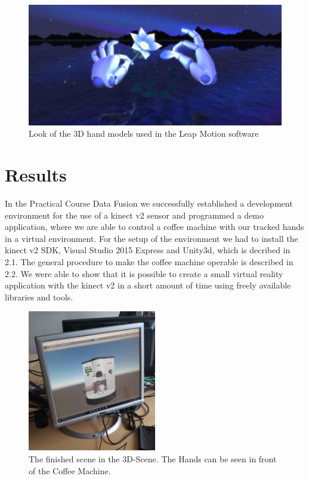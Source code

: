 \documentclass[11pt,a4paper,oldfontcommands, oneside]{memoir}
\begin{document}
\begin{figure}
\includegraphics[width=\textwidth]{./figures/playground-flower-scene}
\caption{Look of the 3D hand models used in the Leap Motion software \cite{leapHandModel}}
\end{figure}


\chapter{Results}

In the Practical Course Data Fusion we successfully established a development environment for the use of a kinect v2 sensor and programmed a demo application, where we are able to control a coffee machine with our tracked hands in a virtual environment. For the setup of the environment we had to install the kinect v2 SDK, Visual Studio 2015 Express and Unity3d, which is decribed in 2.1. The general procedure to make the coffee machine operable is described in 2.2. We were able to show that it is possible to create a small virtual reality application with the kinect v2 in a short amount of time using freely available libraries and tools. 

\begin{figure}
\centering
\includegraphics[width=0.5\textwidth]{./figures/vr_scene.jpg}
\caption{The finished scene in the 3D-Scene. The Hands can be seen in front of the Coffee Machine.}
\end{figure}
\end{document}

